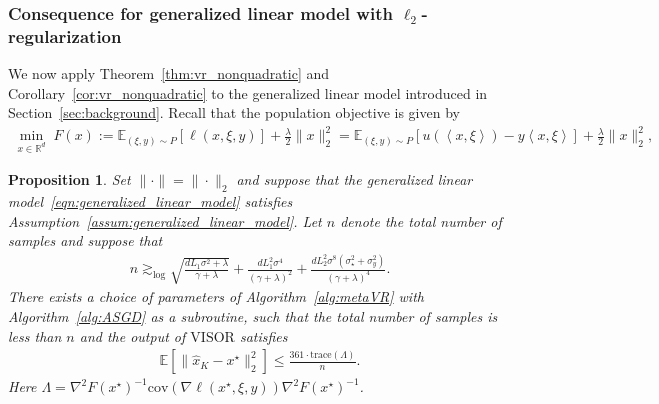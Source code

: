 \documentclass[11pt,twoside]{article}
\numberwithin{equation}{section}
\newcommand{\EE}{\mathbb{E}}
\newcommand{\trace}[1]{\mathrm{trace}\left(#1\right)}
\newcommand{\RR}{\mathbb{R}}
\newcommand{\1}{\mathbf{1}}
\newcommand{\dotp}[1]{\left\langle #1\right\rangle}
\newtheorem{proposition}[theorem]{Proposition}
\theoremstyle{remark}
\theoremstyle{plain}
\newcommand{\cov}{\mathrm{cov}}
\newcommand{\algname}{\mathrm{VISOR}}
\begin{document}
\subsubsection{Consequence for generalized linear model with $\ell_2$-regularization}
We now apply Theorem~\ref{thm:vr_nonquadratic} and Corollary~\ref{cor:vr_nonquadratic} to the generalized linear model introduced in Section~\ref{sec:background}.  Recall that the population objective is given by
\begin{align*}
	\min_{x\in\RR^d}\; F(x)
	:= \EE_{(\xi,y)\sim P}[\ell(x,\xi,y)] +  \frac{\lambda}{2}\|x\|_2^2 = \EE_{(\xi,y)\sim P}\left[u(\dotp{x,\xi}) - y \dotp{x,\xi}\right] + \frac{\lambda}{2}\|x\|_2^2,
\end{align*}
\begin{proposition}
Set $\|\cdot\| = \| \cdot \|_2$ and suppose that the generalized linear model~\eqref{eqn:generalized_linear_model} satisfies Assumption~\ref{assum:generalized_linear_model}.  Let $n$ denote the total number of samples and suppose that 
\begin{align*}
	n \gtrsim_{\log} \sqrt{\frac{d L_1 \sigma^2 + \lambda}{\gamma + \lambda}} + \frac{d L_1^2 \sigma^4}{(\gamma +\lambda)^2} + \frac{d L_2^2 \sigma^8 (\sigma_\star^2 + \sigma_y^2)}{(\gamma +\lambda)^4}.
\end{align*}
There exists a choice of parameters of Algorithm~\ref{alg:metaVR} with Algorithm~\ref{alg:ASGD} as a subroutine, such that the total number of samples is less than $n$ and the output of $\algname$ satisfies
\begin{align*}
	\EE[\|\widehat x_K - x^\star\|_2^2] \le \frac{361 \cdot \trace{\Lambda}}{n}.
\end{align*}
Here $\Lambda= \nabla^2 F(x^\star)^{-1} \cov(\nabla \ell (x^\star, \xi, y))  \nabla^2 F(x^\star)^{-1} $.
\end{proposition}
\end{document}
